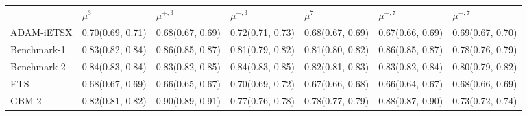 \begin{tabular}{l p{} p{} p{} p{} p{} p{}}
\toprule
 & $\mu^{3}$ & $\mu^{+, 3}$ & $\mu^{-, 3}$ & $\mu^{7}$ & $\mu^{+, 7}$ & $\mu^{-, 7}$ \\
\midrule
ADAM-iETSX & {0.70\newline(0.69, 0.71)} & {0.68\newline(0.67, 0.69)} & {0.72\newline(0.71, 0.73)} & {0.68\newline(0.67, 0.69)} & {0.67\newline(0.66, 0.69)} & {0.69\newline(0.67, 0.70)} \\
Benchmark-1 & {0.83\newline(0.82, 0.84)} & {0.86\newline(0.85, 0.87)} & {0.81\newline(0.79, 0.82)} & {0.81\newline(0.80, 0.82)} & {0.86\newline(0.85, 0.87)} & {0.78\newline(0.76, 0.79)} \\
Benchmark-2 & {0.84\newline(0.83, 0.84)} & {0.83\newline(0.82, 0.85)} & {0.84\newline(0.83, 0.85)} & {0.82\newline(0.81, 0.83)} & {0.83\newline(0.82, 0.84)} & {0.80\newline(0.79, 0.82)} \\
ETS & {0.68\newline(0.67, 0.69)} & {0.66\newline(0.65, 0.67)} & {0.70\newline(0.69, 0.72)} & {0.67\newline(0.66, 0.68)} & {0.66\newline(0.64, 0.67)} & {0.68\newline(0.66, 0.69)} \\
GBM-2 & {0.82\newline(0.81, 0.82)} & {0.90\newline(0.89, 0.91)} & {0.77\newline(0.76, 0.78)} & {0.78\newline(0.77, 0.79)} & {0.88\newline(0.87, 0.90)} & {0.73\newline(0.72, 0.74)} \\

\end{tabular}
